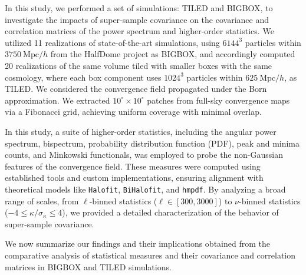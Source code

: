 In this study, we performed a set of simulations: TILED and BIGBOX, to investigate the impacts of super-sample covariance on the covariance and correlation matrices of the power spectrum and higher-order statistics. We utilized 11 realizations of state-of-the-art simulations, using $6144^3$ particles within $3750\ \mathrm{Mpc}/h$ from the HalfDome project \citep{2024arXiv240717462B} as BIGBOX, and accordingly computed 20 realizations of the same volume tiled with smaller boxes with the same cosmology, where each box component uses $1024^3$ particles within $625\ \mathrm{Mpc}/h$, as TILED. We considered the convergence field propagated under the Born approximation. We extracted $10^\circ \times 10^\circ$ patches from full-sky convergence maps via a Fibonacci grid, achieving uniform coverage with minimal overlap.

In this study, a suite of higher-order statistics, including the angular power spectrum, bispectrum, probability distribution function (PDF), peak and minima counts, and Minkowski functionals, was employed to probe the non-Gaussian features of the convergence field. These measures were computed using established tools and custom implementations, ensuring alignment with theoretical models like \texttt{Halofit}, \texttt{BiHalofit}, and \texttt{hmpdf}. By analyzing a broad range of scales, from $\ell$-binned statistics ($\ell \in [300, 3000]$) to $\nu$-binned statistics ($-4 \leq \kappa/\sigma_\kappa \leq 4$), we provided a detailed characterization of the behavior of super-sample covariance.

We now summarize our findings and their implications obtained from the comparative analysis of statistical measures and their covariance and correlation matrices in BIGBOX and TILED simulations.

